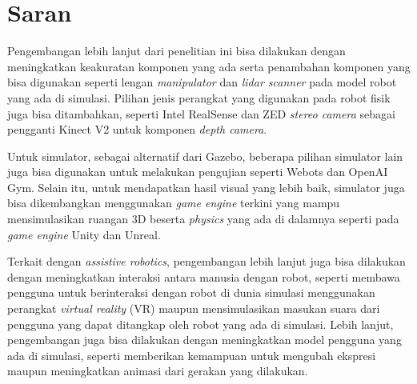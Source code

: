 \section{Saran}
\label{chap:saran}

Pengembangan lebih lanjut dari penelitian ini bisa dilakukan dengan meningkatkan keakuratan komponen yang ada serta penambahan komponen yang bisa digunakan seperti lengan \emph{manipulator} dan \emph{lidar scanner} pada model robot yang ada di simulasi.
Pilihan jenis perangkat yang digunakan pada robot fisik juga bisa ditambahkan,
  seperti Intel RealSense dan ZED \emph{stereo camera} sebagai pengganti Kinect V2 untuk komponen \emph{depth camera}.

Untuk simulator, sebagai alternatif dari Gazebo,
  beberapa pilihan simulator lain juga bisa digunakan untuk melakukan pengujian seperti Webots dan OpenAI Gym.
Selain itu, untuk mendapatkan hasil visual yang lebih baik,
  simulator juga bisa dikembangkan menggunakan \emph{game engine} terkini yang mampu mensimulasikan ruangan 3D beserta \emph{physics} yang ada di dalamnya seperti pada \emph{game engine} Unity dan Unreal.

Terkait dengan \emph{assistive robotics},
  pengembangan lebih lanjut juga bisa dilakukan dengan meningkatkan interaksi antara manusia dengan robot,
  seperti membawa pengguna  untuk berinteraksi dengan robot di dunia simulasi menggunakan perangkat \emph{virtual reality} (VR) maupun mensimulasikan masukan suara dari pengguna yang dapat ditangkap oleh robot yang ada di simulasi.
Lebih lanjut, pengembangan juga bisa dilakukan dengan meningkatkan model pengguna yang ada di simulasi, seperti memberikan kemampuan untuk mengubah ekspresi maupun meningkatkan animasi dari gerakan yang dilakukan.
